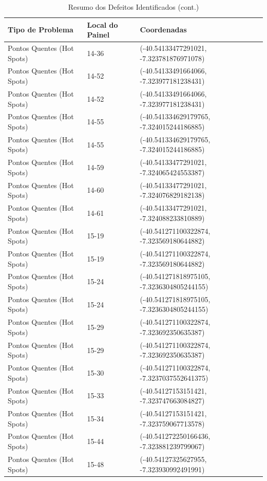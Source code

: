 \documentclass[dvipsnames]{article}%
\begin{document}
\begin{table}[h!]%
\caption{Resumo dos Defeitos Identificados (cont.)}%
\begin{tabular}{lll}%
\toprule%
Tipo de Problema&Local do Painel&Coordenadas\\%
\midrule%
Pontos Quentes (Hot Spots)&14{-}36&({-}40.54133477291021, {-}7.323781876971078)\\%
Pontos Quentes (Hot Spots)&14{-}52&({-}40.54133491664066, {-}7.323977181238431)\\%
Pontos Quentes (Hot Spots)&14{-}52&({-}40.54133491664066, {-}7.323977181238431)\\%
Pontos Quentes (Hot Spots)&14{-}55&({-}40.541334629179765, {-}7.324015244186885)\\%
Pontos Quentes (Hot Spots)&14{-}55&({-}40.541334629179765, {-}7.324015244186885)\\%
Pontos Quentes (Hot Spots)&14{-}59&({-}40.54133477291021, {-}7.324065424553387)\\%
Pontos Quentes (Hot Spots)&14{-}60&({-}40.54133477291021, {-}7.324076829182138)\\%
Pontos Quentes (Hot Spots)&14{-}61&({-}40.54133477291021, {-}7.324088233810889)\\%
Pontos Quentes (Hot Spots)&15{-}19&({-}40.541271100322874, {-}7.323569180644882)\\%
Pontos Quentes (Hot Spots)&15{-}19&({-}40.541271100322874, {-}7.323569180644882)\\%
Pontos Quentes (Hot Spots)&15{-}24&({-}40.541271818975105, {-}7.3236304805244155)\\%
Pontos Quentes (Hot Spots)&15{-}24&({-}40.541271818975105, {-}7.3236304805244155)\\%
Pontos Quentes (Hot Spots)&15{-}29&({-}40.541271100322874, {-}7.323692350635387)\\%
Pontos Quentes (Hot Spots)&15{-}29&({-}40.541271100322874, {-}7.323692350635387)\\%
Pontos Quentes (Hot Spots)&15{-}30&({-}40.541271100322874, {-}7.3237037552641375)\\%
Pontos Quentes (Hot Spots)&15{-}33&({-}40.54127153151421, {-}7.323747663084827)\\%
Pontos Quentes (Hot Spots)&15{-}34&({-}40.54127153151421, {-}7.323759067713578)\\%
Pontos Quentes (Hot Spots)&15{-}44&({-}40.541272250166436, {-}7.323881239799067)\\%
Pontos Quentes (Hot Spots)&15{-}48&({-}40.54127325627955, {-}7.323930992491991)\\%

\end{tabular}
\end{table}
\end{document}
